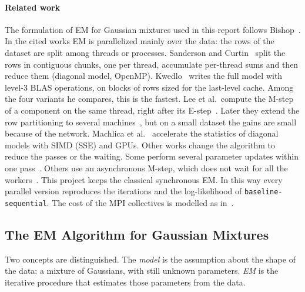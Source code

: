 \documentclass[conference,onecolumn]{IEEEtran}
\newcommand{\vseq}{\texttt{baseline-\allowbreak sequential}}
\begin{document}
\paragraph{Related work} The formulation of EM for Gaussian mixtures used in this report follows Bishop~\cite[Ch.~9]{bishop}. In the cited works EM is parallelized mainly over the data: the rows of the dataset are split among threads or processes. Sanderson and Curtin~\cite{sanderson} split the rows in contiguous chunks, one per thread, accumulate per-thread sums and then reduce them (diagonal model, OpenMP). Kwedlo~\cite{kwedlo} writes the full model with level-3 BLAS operations, on blocks of rows sized for the last-level cache. Among the four variants he compares, this is the fastest. Lee et al.\ compute the M-step of a component on the same thread, right after its E-step~\cite{lee2016}. Later they extend the row partitioning to several machines~\cite{lee2020}, but on a small dataset the gains are small because of the network. Machlica et al.~\cite{machlica} accelerate the statistics of diagonal models with SIMD (SSE) and GPUs. Other works change the algorithm to reduce the passes or the waiting. Some perform several parameter updates within one pass~\cite{yin}. Others use an asynchronous M-step, which does not wait for all the workers~\cite{srivastava}. This project keeps the classical synchronous EM. In this way every parallel version reproduces the iterations and the log-likelihood of \vseq{}. The cost of the MPI collectives is modelled as in~\cite{thakur}.

\subsection{The EM Algorithm for Gaussian Mixtures}
Two concepts are distinguished. The \emph{model} is the assumption about the shape of the data: a mixture of Gaussians, with still unknown parameters. \emph{EM} is the iterative procedure that estimates those parameters from the data.
\end{document}
